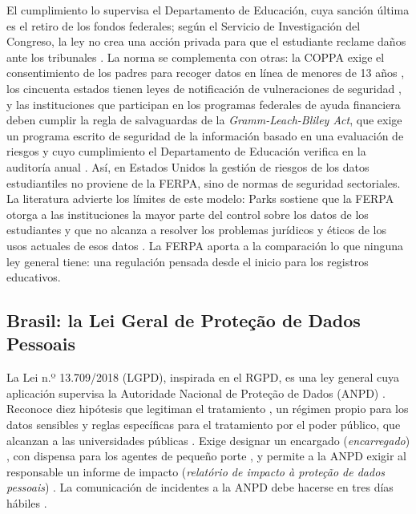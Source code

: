 El cumplimiento lo supervisa el Departamento de Educación, cuya sanción última es el retiro de los fondos federales; según el Servicio de Investigación del Congreso, la ley no crea una acción privada para que el estudiante reclame daños ante los tribunales \cite{crs2021ferpa}. La norma se complementa con otras: la COPPA exige el consentimiento de los padres para recoger datos en línea de menores de 13 años \cite{coppa1998}, los cincuenta estados tienen leyes de notificación de vulneraciones de seguridad \cite{ncsl2022breach}, y las instituciones que participan en los programas federales de ayuda financiera deben cumplir la regla de salvaguardas de la \textit{Gramm-Leach-Bliley Act}, que exige un programa escrito de seguridad de la información basado en una evaluación de riesgos y cuyo cumplimiento el Departamento de Educación verifica en la auditoría anual \cite{ftc2021safeguards,fsa2023glba}. Así, en Estados Unidos la gestión de riesgos de los datos estudiantiles no proviene de la FERPA, sino de normas de seguridad sectoriales.
La literatura advierte los límites de este modelo: Parks sostiene que la FERPA otorga a las instituciones la mayor parte del control sobre los datos de los estudiantes y que no alcanza a resolver los problemas jurídicos y éticos de los usos actuales de esos datos \cite{parks2017ferpa}. La FERPA aporta a la comparación lo que ninguna ley general tiene: una regulación pensada desde el inicio para los registros educativos.

\subsection{Brasil: la Lei Geral de Proteção de Dados Pessoais}
\label{sec:marco_lgpd}

La Lei n.º 13.709/2018 (LGPD), inspirada en el RGPD, es una ley general cuya aplicación supervisa la Autoridade Nacional de Proteção de Dados (ANPD) \cite{brasil2018lgpd}. Reconoce diez hipótesis que legitiman el tratamiento \cite[art.~7]{brasil2018lgpd}, un régimen propio para los datos sensibles \cite[art.~11]{brasil2018lgpd} y reglas específicas para el tratamiento por el poder público, que alcanzan a las universidades públicas \cite[arts.~23 a 30]{brasil2018lgpd}. Exige designar un encargado (\textit{encarregado}) \cite[art.~41]{brasil2018lgpd}, con dispensa para los agentes de pequeño porte \cite{anpd2022pequeno}, y permite a la ANPD exigir al responsable un informe de impacto (\textit{relatório de impacto à proteção de dados pessoais}) \cite[art.~38]{brasil2018lgpd}. La comunicación de incidentes a la ANPD debe hacerse en tres días hábiles \cite{anpd2024incidentes}.

